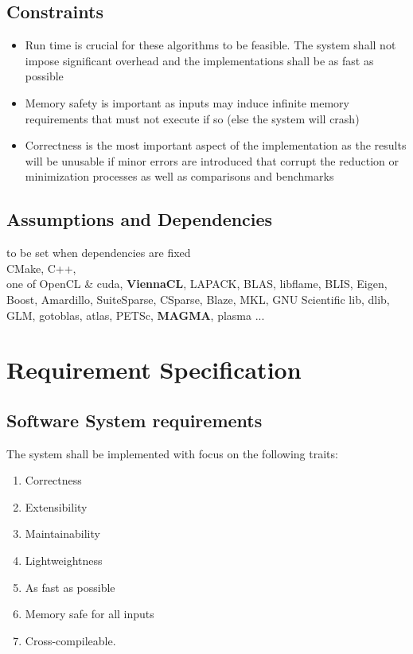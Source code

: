         \subsection{Constraints}
            \begin{itemize}
                \item Run time is crucial for these algorithms to be feasible. The system shall not impose significant overhead and the implementations shall be as fast as possible
                \item Memory safety is important as inputs may induce infinite memory requirements that must not execute if so (else the system will crash)
                \item Correctness is the most important aspect of the implementation as the results will be unusable if minor errors are introduced that corrupt the reduction or minimization processes as well as comparisons and benchmarks
            \end{itemize}

        \subsection{Assumptions and Dependencies}
            to be set when dependencies are fixed \\
            CMake, C++, \\
            one of OpenCL \& cuda, \textbf{ViennaCL}, LAPACK, BLAS, libflame, BLIS, Eigen, Boost, Amardillo, SuiteSparse, CSparse, Blaze, MKL, GNU Scientific lib, dlib, GLM, gotoblas, atlas, PETSc, \textbf{MAGMA}, plasma ...
    \newpage       
    
    
    \section{Requirement Specification}
        \subsection{Software System requirements}
            The system shall be implemented with focus on the following traits:
            \begin{enumerate}[S 1.]
                    \item Correctness
                    \item Extensibility
                    \item Maintainability
                    \item Lightweightness
                    \item As fast as possible
                    \item Memory safe for all inputs
                    \item Cross-compileable.
            \end{enumerate}  
    
